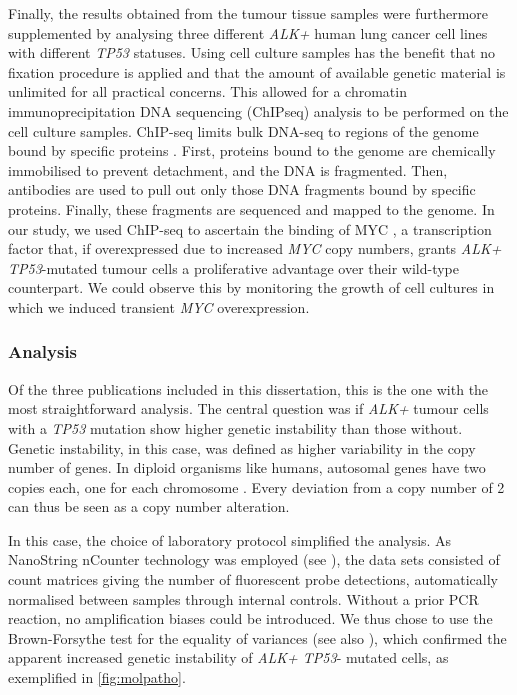 Finally\label{mar:cellcult}, the results obtained
from the tumour tissue samples were furthermore supplemented by analysing
three different \textit{ALK+} human lung cancer cell lines with different
\textit{TP53} statuses. Using cell culture samples has the benefit that no
fixation procedure is applied and that the amount of available genetic
material is unlimited for all practical concerns. This allowed for a chromatin
immunoprecipitation DNA sequencing (ChIPseq) analysis to be performed on the
cell culture samples. ChIP-seq limits bulk DNA-seq to regions of the genome
bound by specific proteins \citep{Park2009}. First, proteins bound to the
genome are chemically immobilised to prevent detachment, and the DNA is
fragmented. Then, antibodies are used to pull out only those DNA fragments
bound by specific proteins. Finally, these fragments are sequenced and mapped
to the genome. In our study, we used ChIP-seq to ascertain the binding of MYC
\citep{Dang2012}, a transcription factor that, if overexpressed due to
increased \textit{MYC} copy numbers, grants \textit{ALK+ TP53}-mutated tumour
cells a proliferative advantage over their wild-type counterpart. We could
observe this by monitoring the growth of cell cultures in which we induced
transient \textit{MYC} overexpression.

\subsubsection{Analysis}\label{subsubsec:alkanalysis}
Of the three publications included in this dissertation, this is the one with
the most straightforward analysis. The central question was if \textit{ALK+}
tumour cells with a \textit{TP53} mutation show higher genetic instability
than those without. Genetic instability, in this case, was defined as higher
variability in the copy number of genes. In diploid organisms like humans,
autosomal genes have two copies each, one for each chromosome \citep{Hartl2009}.
Every deviation from a copy number of \num{2} can thus be seen as a copy
number alteration.

In this case, the choice of laboratory protocol simplified the analysis. As
NanoString nCounter technology was employed (see ),
the data sets consisted of count matrices giving the number of fluorescent
probe detections, automatically normalised between samples through internal
controls. Without a prior PCR reaction, no amplification biases could be
introduced. We thus chose to use the Brown-Forsythe test for the equality of
variances \citep{Brown1974} (see also ), which
confirmed the apparent increased genetic instability of \textit{ALK+ TP53}-
mutated cells, as exemplified in \cref{fig:molpatho}.

